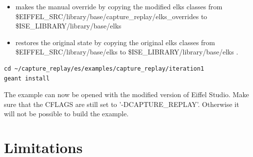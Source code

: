 \begin{itemize}
\item {} makes the manual override by copying the modified elks classes from \$EIFFEL\_SRC/library/base/capture\_replay/elks\_overrides to \$ISE\_LIBRARY/library/base/elks \\
\item {} restores the original state by copying the original elks classes from \$EIFFEL\_SRC/library/base/elks to \$ISE\_LIBRARY/library/base/elks .
\end{itemize}

\begin{lstlisting}
cd ~/capture_replay/es/examples/capture_replay/iteration1
geant install
\end{lstlisting}

The example can now be opened with the modified version of Eiffel Studio. Make sure that the CFLAGS are still set to '-DCAPTURE\_REPLAY'. Otherwise it will not be possible to build the example.



\section {Limitations}
